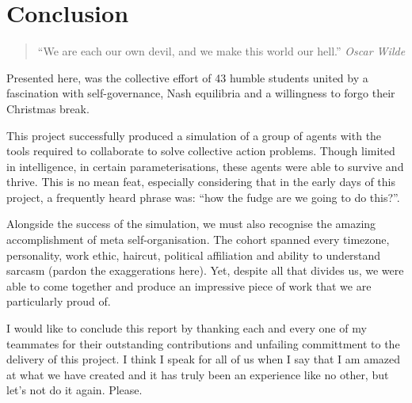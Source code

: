 \chapter{Conclusion}


\begin{flushleft}
    \begin{quote}
        ``We are each our own devil, and we make this world our hell.''
        \linebreak
        \emph{Oscar Wilde}
    \end{quote}
\end{flushleft}

Presented here, was the collective effort of 43 humble students united by a fascination with self-governance, Nash equilibria and a willingness to forgo their Christmas break. 

This project successfully produced a simulation of a group of agents with the tools required to collaborate to solve collective action problems. Though limited in intelligence, in certain parameterisations, these agents were able to survive and thrive. This is no mean feat, especially considering that in the early days of this project, a frequently heard phrase was: ``how the fudge are we going to do this?''.

Alongside the success of the simulation, we must also recognise the amazing accomplishment of meta self-organisation. The cohort spanned every timezone, personality, work ethic, haircut, political affiliation and ability to understand sarcasm (pardon the exaggerations here). Yet, despite all that divides us, we were able to come together and produce an impressive piece of work that we are particularly proud of. 

I would like to conclude this report by thanking each and every one of my teammates for their outstanding contributions and unfailing committment to the delivery of this project. I think I speak for all of us when I say that I am amazed at what we have created and it has truly been an experience like no other, but let's not do it again. Please.
